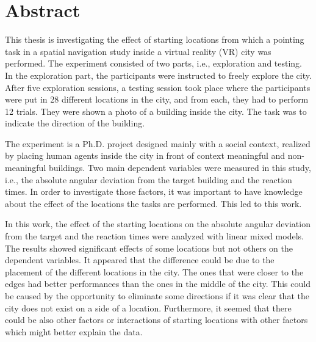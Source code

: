 \chapter*{Abstract}\label{cha:abstract}


This thesis is investigating the effect of starting locations from which a pointing task in a spatial navigation study inside a virtual reality (VR) city was performed. The experiment consisted of two parts, i.e., exploration and testing. In the exploration part, the participants were instructed to freely explore the city. After five exploration sessions, a testing session took place where the participants were put in 28 different locations in the city, and from each, they had to perform 12 trials. They were shown a photo of a building inside the city. The task was to indicate the direction of the building.

The experiment is a Ph.D. project designed mainly with a social context, realized by placing human agents inside the city in front of context meaningful and non-meaningful buildings. Two main dependent variables were measured in this study, i.e., the absolute angular deviation from the target building and the reaction times. In order to investigate those factors, it was important to have knowledge about the effect of the locations the tasks are performed. This led to this work.

In this work, the effect of the starting locations on the absolute angular deviation from the target and the reaction times were analyzed with linear mixed models. The results showed significant effects of some locations but not others on the dependent variables. It appeared that the difference could be due to the placement of the different locations in the city. The ones that were closer to the edges had better performances than the ones in the middle of the city. This could be caused by the opportunity to eliminate some directions if it was clear that the city does not exist on a side of a location. Furthermore, it seemed that there could be also other factors or interactions of starting locations with other factors which might better explain the data.

\newpage
\shipout\null
